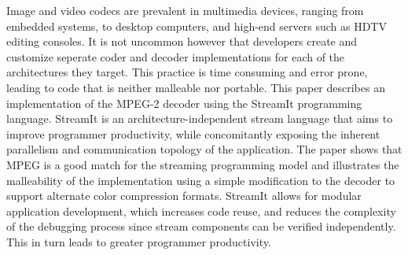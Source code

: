 \vspace{-6pt}
Image and video codecs are prevalent in multimedia devices, ranging
from embedded systems, to desktop computers, and high-end servers such
as HDTV editing consoles. It is not uncommon however that developers
create and customize seperate coder and decoder implementations for
each of the architectures they target. This practice is time 
consuming and error prone, leading to
code that is neither malleable nor portable. This paper describes an
implementation of the MPEG-2 decoder using the StreamIt programming
language. StreamIt is an architecture-independent stream language that
aims to improve programmer productivity, while concomitantly exposing
the inherent parallelism and communication topology of the
application. The paper shows that MPEG is a good match for the
streaming programming model and illustrates the malleability of the
implementation using a simple modification to the decoder to support
alternate color compression formats. StreamIt allows for modular
application development, which increases code reuse, and reduces the
complexity of the debugging process since stream components can be
verified independently. This in turn leads to greater programmer
productivity.
